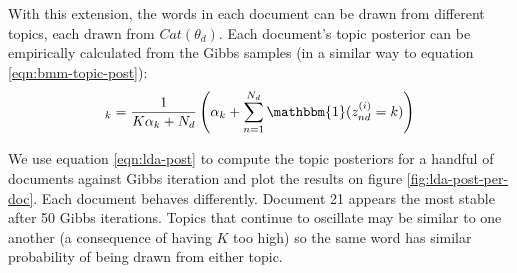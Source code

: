 \documentclass[]{article}
\begin{document}
With this extension, the words in each document can be drawn from different topics, each drawn from $Cat(\theta_d)$. Each document's topic posterior can be empirically calculated from the Gibbs samples (in a similar way to equation \ref{eqn:bmm-topic-post}):
%
\begin{equation}
	[\theta^{(i)}_d]_k = \frac{1}{K\alpha_k + N_d} \left( \alpha_k +  \sum_{n=1}^{N_d} \mathbbm{1}(z^{(i)}_{nd} = k) \right)
	\label{eqn:lda-post}
\end{equation}

We use equation \ref{eqn:lda-post} to compute the topic posteriors for a handful of documents against Gibbs iteration and plot the results on figure \ref{fig:lda-post-per-doc}. Each document behaves differently. Document 21 appears the most stable after 50 Gibbs iterations. Topics that continue to oscillate may be similar to one another (a consequence of having $K$ too high) so the same word has similar probability of being drawn from either topic.
%
\end{document}
